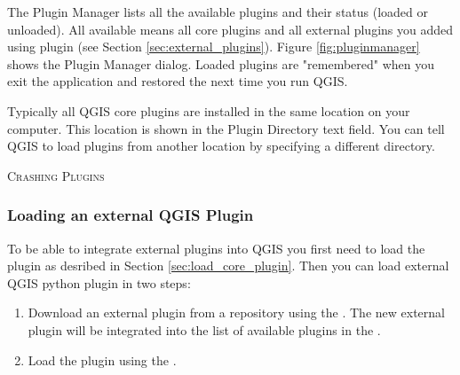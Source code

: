 The Plugin Manager lists all the available plugins and their status (loaded or unloaded).
All available means all core plugins and all external plugins you added using  plugin (see Section \ref{sec:external_plugins}). 
Figure \ref{fig:pluginmanager} shows the Plugin Manager dialog.
Loaded plugins are "remembered" when you exit the application and restored the next time you run QGIS.

Typically all QGIS core plugins are installed in the same location on your computer.
This location is shown in the Plugin Directory text field.
You can tell QGIS to load plugins from another location by specifying a different directory.

\begin{Tip}\caption{\textsc{Crashing Plugins}}
\end{Tip} 

\subsubsection{Loading an external QGIS Plugin}\label{sec:load_external_plugin} 

To be able to integrate external plugins into QGIS you first need to load the  plugin as desribed in Section \ref{sec:load_core_plugin}.
Then you can load external QGIS python plugin in two steps: 

\begin{enumerate}
\item Download an external plugin from a repository using the .
The new external plugin will be integrated into the list of available plugins in the .
\item Load the plugin using the .
\end{enumerate}

